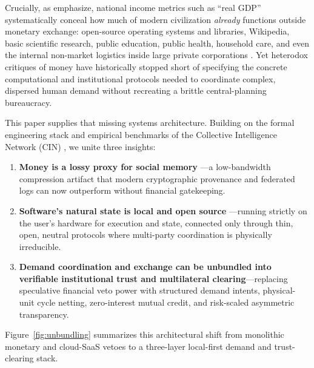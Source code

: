 \documentclass[11pt]{article}
\begin{document}
Crucially, as \citet{mason2026against} emphasize, national income metrics such as ``real GDP'' systematically conceal how much of modern civilization \emph{already} functions outside monetary exchange: open-source operating systems and libraries, Wikipedia, basic scientific research, public education, public health, household care, and even the internal non-market logistics inside large private corporations \citep{coase1937firm, benkler2002coase}. Yet heterodox critiques of money have historically stopped short of specifying the concrete computational and institutional protocols needed to coordinate complex, dispersed human demand without recreating a brittle central-planning bureaucracy.

This paper supplies that missing systems architecture. Building on the formal engineering stack and empirical benchmarks of the Collective Intelligence Network (CIN) \citep{baker2026cin}, we unite three insights:
\begin{enumerate}
  \item \textbf{Money is a lossy proxy for social memory} \citep{kocherlakota1998memory}---a low-bandwidth compression artifact that modern cryptographic provenance and federated logs can now outperform without financial gatekeeping.
  \item \textbf{Software's natural state is local and open source} \citep{kleppmann2019local, benkler2002coase}---running strictly on the user's hardware for execution and state, connected only through thin, open, neutral protocols where multi-party coordination is physically irreducible.
  \item \textbf{Demand coordination and exchange can be unbundled into verifiable institutional trust and multilateral clearing}---replacing speculative financial veto power with structured demand intents, physical-unit cycle netting, zero-interest mutual credit, and risk-scaled asymmetric transparency.
\end{enumerate}

Figure~\ref{fig:unbundling} summarizes this architectural shift from monolithic monetary and cloud-SaaS vetoes to a three-layer local-first demand and trust-clearing stack.
\end{document}

